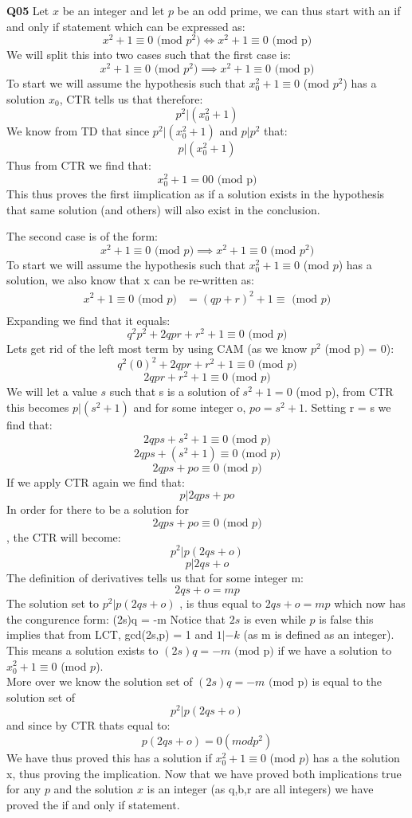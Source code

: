 \documentclass[11pt]{article}0
\begin{document}
\parindent=0pt
\textbf{Q05} Let $x$ be an integer and let $p$ be an odd prime, we can thus start with an if and only if statement which can be expressed as:
\[ x^2+1 \equiv 0 \text{ (mod $p^2$)}  \iff x^2+1 \equiv 0 \text{ (mod p)}\]
We will split this into two cases such that the first case is:
\[ x^2+1 \equiv 0 \text{ (mod $p^2$)}  \implies x^2+1 \equiv 0 \text{ (mod p)}\]
To start we will assume the hypothesis such that $x_0^2+1 \equiv 0$ (mod $p^2$) has a solution $x_0$, CTR tells us that therefore:
\[ p^2 | (x_0^2 + 1) \]
We know from TD that since  $p^2 | (x_0^2 + 1)$ and $p|p^2$ that:
\[ p | (x_0^2 + 1) \]
Thus from CTR we find that:
\[ x_0^2 + 1 = 0 0 \text{ (mod p)} \]
This thus proves the first iimplication as if a solution exists in the hypothesis that same solution (and others) will also exist in the conclusion.

The second case is of the form:
\[ x^2+1 \equiv 0 \text{ (mod $p$)}  \implies x^2+1 \equiv 0 \text{ (mod $p^2$)}\]
To start we will assume the hypothesis such that $x_0^2+1 \equiv 0$ (mod $p$) has a solution, we also know that x can be re-written as:
\begin{align*}
x^2+1 \equiv 0 \text{ (mod $p$)} & = (qp+r)^2 + 1  \equiv \text{ (mod $p$)} \\
\end{align*}
Expanding we find that  it equals:
\[ q^2p^2 +2qpr + r^2 + 1  \equiv 0 \text{ (mod $p$)}\]
Lets get rid of the left most term by using CAM (as we know $p^2$ (mod p) = 0):
\[ q^2(0)^2 +2qpr + r^2 + 1  \equiv 0 \text{ (mod $p$)}\]
\[ 2qpr + r^2 + 1  \equiv 0 \text{ (mod $p$)}\]
We will let a value $s$ such that s is a solution of $s^2 + 1 = 0$ (mod p), from CTR this becomes $p|(s^2+1)$ and for some integer o, $po = s^2+1$. Setting r = s we find that:
\[ 2qps + s^2 + 1  \equiv 0 \text{ (mod $p$)}\]
\[ 2qps + (s^2 + 1)  \equiv 0 \text{ (mod $p$)}\]
\[ 2qps +po \equiv 0 \text{ (mod $p$)}\]
If we apply CTR again we find that:
\[ p | 2qps +po \]
In order for there to be a solution for \[ 2qps +po \equiv 0 \text{ (mod $p$)}\], the CTR will become:
\[ p^2 | p(2qs +o) \]
\[ p |2qs +o \]
The definition of derivatives tells us that for some integer m:
\[ 2qs + o = mp \]
The solution set to $p^2 | p(2qs +o)$ , is thus equal to $2qs + o = mp$ which now has the congurence form:
(2s)q = -m 
Notice that $2s$ is even while $p$ is false this implies that from LCT, gcd(2s,p) = 1 and $1|-k$ (as m is defined as an integer). This means a solution exists to $(2s)q = -m \text{ (mod p)}$ if we have a solution to  $x_0^2+1 \equiv 0$ (mod $p$). \\More over we know the solution set of $(2s)q = -m \text{ (mod p)}$ is equal to the solution set of \[ p^2 | p(2qs +o) \] and since by CTR thats equal to:
\[ p(2qs +o) = 0 (mod p^2) \]
We have thus proved this has a solution if  $x_0^2+1 \equiv 0$ (mod $p$) has a the solution x, thus proving the implication. Now that we have proved both implications true for any $p$ and the solution $x$ is an integer (as q,b,r are all integers) we have proved the if and only if statement.
\end{document}
